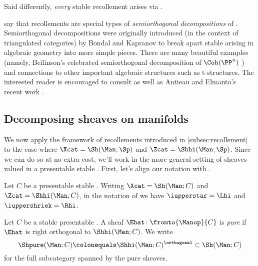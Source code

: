 \noindent Said differently, \textit{every} stable recollement arises via .

\begin{remark}
	 say that recollements are special types of \textit{semiorthogonal decompositions} of \categories.
	Semiorthogonal decompositions were originally introduced (in the context of triangulated categories) by Bondal and Kapranov \cite{MR1039961} to break apart stable \categories arising in algebraic geometry into more simple pieces.
	There are many beautiful examples (namely, Beĭlinson's celebrated semiorthogonal decomposition of $ \Coh(\PP^n) $ \cites{MR509388}{MR863137}) and connections to other important algebraic structures such as $ \mathrm{t} $-structures.
	The interested reader is encouraged to consult \cite[]{SAG} as well as Antieau and Elmanto's recent work \cite{MR4205113}.
\end{remark}



\subsection{Decomposing sheaves on manifolds}\label{subsec:fracture}

We now apply the framework of recollements introduced in \cref{subsec:recollement} to the case where $ \Xcat = \Sh(\Man;\Sp) $ and $ \Zcat = \Shhi(\Man;\Sp) $.
Since we can do so at no extra cost, we'll work in the more general setting of sheaves valued in a presentable stable \category. 
First, let's align our notation with .

\begin{nul}
	Let $ C $ be a presentable stable \category.
	Writing $ \Xcat = \Sh(\Man;C) $ and $ \Zcat = \Shhi(\Man;C) $, in the notation of  we have $ \iupperstar = \Lhi $ and $ \iuppershriek = \Rhi $.
\end{nul}

\begin{definition}\label{def:pursheaf}
	Let $ C $ be a stable presentable \category.
	A sheaf $ \Ehat \colon \fromto{\Manop}{C} $ is \textit{pure} if $ \Ehat $ is right orthogonal to $ \Shhi(\Man;C) $. 
	We write
	\begin{equation*}
		\Shpure(\Man;C) \colonequals \Shhi(\Man;C)^{\orthogonal} \subset \Sh(\Man;C)
	\end{equation*}
	for the full subcategory spanned by the pure sheaves.
\end{definition}

